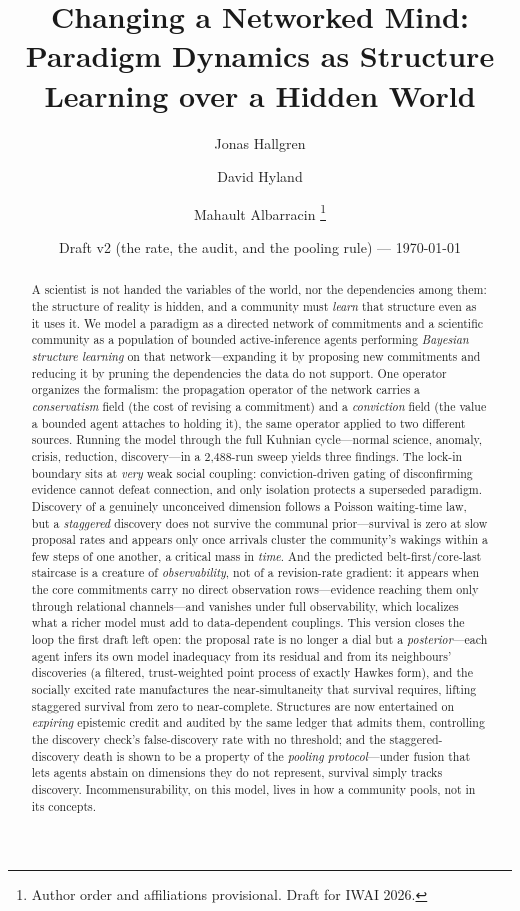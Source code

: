 \documentclass[11pt]{article}
\title{\bfseries Changing a Networked Mind:\\[2pt]
\large Paradigm Dynamics as Structure Learning over a Hidden World}
\author{Jonas Hallgren \and David Hyland \and Mahault Albarracin%
\thanks{Author order and affiliations provisional. Draft for IWAI 2026.}}
\date{Draft v2 (the rate, the audit, and the pooling rule) --- \today}
\begin{document}
\maketitle

\begin{abstract}
A scientist is not handed the variables of the world, nor the dependencies among them: the structure
of reality is hidden, and a community must \emph{learn} that structure even as it uses it. We model a
paradigm as a directed network of commitments and a scientific community as a population of bounded
active-inference agents performing \emph{Bayesian structure learning} on that network---expanding it
by proposing new commitments and reducing it by pruning the dependencies the data do not support. One
operator organizes the formalism: the propagation operator of the network carries a
\emph{conservatism} field (the cost of revising a commitment) and a \emph{conviction} field (the
value a bounded agent attaches to holding it), the same operator applied to two different sources.
Running the model through the full Kuhnian cycle---normal science, anomaly, crisis, reduction,
discovery---in a 2{,}488-run sweep yields three findings. The lock-in boundary sits at \emph{very}
weak social coupling: conviction-driven gating of disconfirming evidence cannot defeat connection,
and only isolation protects a superseded paradigm. Discovery of a genuinely unconceived dimension
follows a Poisson waiting-time law, but a \emph{staggered} discovery does not survive the communal
prior---survival is zero at slow proposal rates and appears only once arrivals cluster the
community's wakings within a few steps of one another, a critical mass in \emph{time}. And the predicted belt-first/core-last staircase is a creature of \emph{observability},
not of a revision-rate gradient: it appears when the core commitments carry no direct observation
rows---evidence reaching them only through relational channels---and vanishes under full
observability, which localizes what a richer model must add to data-dependent couplings.
This version closes the loop the first draft left open: the proposal rate is no longer a dial but
a \emph{posterior}---each agent infers its own model inadequacy from its residual and from its
neighbours' discoveries (a filtered, trust-weighted point process of exactly Hawkes form), and the
socially excited rate manufactures the near-simultaneity that survival requires, lifting staggered
survival from zero to near-complete. Structures are now entertained on \emph{expiring} epistemic
credit and audited by the same ledger that admits them, controlling the discovery check's
false-discovery rate with no threshold; and the staggered-discovery death is shown to be a property
of the \emph{pooling protocol}---under fusion that lets agents abstain on dimensions they do not
represent, survival simply tracks discovery. Incommensurability, on this model, lives in how a
community pools, not in its concepts.
\end{abstract}
\end{document}
